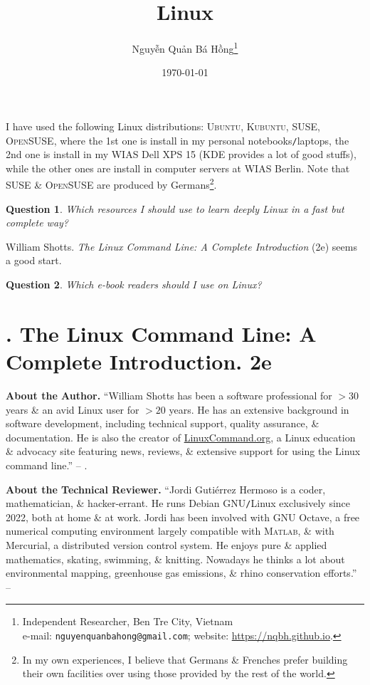 \documentclass[oneside]{book}
\title{Linux}
\author{\selectlanguage{vietnamese} Nguyễn Quản Bá Hồng\footnote{Independent Researcher, Ben Tre City, Vietnam\\e-mail: \texttt{nguyenquanbahong@gmail.com}; website: \url{https://nqbh.github.io}.}}
\date{\today}
\numberwithin{equation}{section}
\newtheorem{question}{Question}[chapter]
\begin{document}
\maketitle
\setcounter{secnumdepth}{4}
\setcounter{tocdepth}{3}
\tableofcontents

I have used the following Linux distributions: \textsc{Ubuntu, Kubuntu, SUSE, OpenSUSE}, where the 1st one is install in my personal notebooks\texttt{/}laptops, the 2nd one is install in my WIAS Dell XPS 15 (KDE provides a lot of good stuffs), while the other ones are install in computer servers at WIAS Berlin. Note that SUSE \& \textsc{OpenSUSE} are produced by Germans\footnote{In my own experiences, I believe that Germans \& Frenches prefer building their own facilities over using those provided by the rest of the world.}.

\begin{question}
	Which resources I should use to learn deeply Linux in a fast but complete way?
\end{question}
William Shotts. \textit{The Linux Command Line: A Complete Introduction} (2e) seems a good start.

\begin{question}
	Which e-book readers should I use on Linux?
\end{question}


\chapter{\cite{Shotts2019}. The Linux Command Line: A Complete Introduction. 2e}

\textbf{About the Author.} ``William Shotts has been a software professional for $> 30$ years \& an avid Linux user for $> 20$ years. He has an extensive background in software development, including technical support, quality assurance, \& documentation. He is also the creator of \url{LinuxCommand.org}, a Linux education \& advocacy site featuring news, reviews, \& extensive support for using the Linux command line.'' -- \cite[p. 6]{Shotts2019}.

\noindent\textbf{About the Technical Reviewer.} ``Jordi Guti\'errez Hermoso is a coder, mathematician, \& hacker-errant. He runs Debian GNU\texttt{/}Linux exclusively since 2022, both at home \& at work. Jordi has been involved with GNU Octave, a free numerical computing environment largely compatible with \textsc{Matlab}, \& with Mercurial, a distributed version control system. He enjoys pure \& applied mathematics, skating, swimming, \& knitting. Nowadays he thinks a lot about environmental mapping, greenhouse gas emissions, \& rhino conservation efforts.'' -- \cite[p. 7]{Shotts2019}
\end{document}
